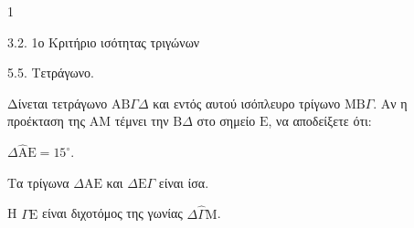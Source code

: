 \begin{ylh}{1}
    \item 3.2. 1ο Κριτήριο ισότητας τριγώνων
    \item 5.5. Τετράγωνο.
\end{ylh}
Δίνεται τετράγωνο $\mathrm{A}\mathrm{B}\Gamma\Delta$ και εντός αυτού ισόπλευρο τρίγωνο $\mathrm{M}\mathrm{B}\Gamma$. Αν η προέκταση της $\mathrm{A}\mathrm{M}$ τέμνει την $\mathrm{B}\Delta$ στο σημείο $\mathrm{E}$, να αποδείξετε ότι:
\begin{alist}
    \item $\Delta\hat{\mathrm{A}}\mathrm{E} = 15^\circ$. 
    \item Τα τρίγωνα $\Delta\mathrm{A}\mathrm{E}$ και $\Delta\mathrm{E}\Gamma$ είναι ίσα. 
    \item Η $\Gamma\mathrm{E}$ είναι διχοτόμος της γωνίας $\Delta\hat{\Gamma}\mathrm{M}$. 
\end{alist}
